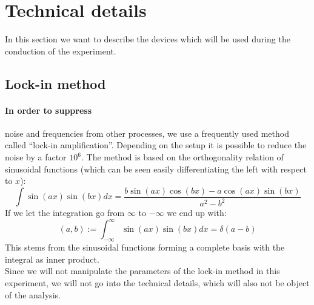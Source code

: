 \section{Technical details}
\label{sec:technics}
In this section we want to describe the devices which will be used during the
conduction of the experiment.
\subsection{Lock-in method}
\paragraph{In order to suppress}
noise and frequencies from other processes, we use
a frequently used method called ``lock-in amplification''. Depending on the
setup it is possible to reduce the noise by a factor $10^6$. The method
is based on the orthogonality relation of sinusoidal functions (which
    can be seen easily differentiating the left with respect to $x$):
\begin{equation}
    \int \sin(a x) \sin(b x) dx =\frac{ b \sin(a x) \cos(b x)-a \cos(a x)
        \sin(b x)}{a^2-b^2}
\end{equation}
If we let the integration go from $\infty$ to $-\infty$ we end up with:
\begin{equation}
    (a,b) := \int_{-\infty}^{\infty} \sin(a x) \sin(b x) dx = \delta(a - b)
\end{equation}
This stems from the sinusoidal functions forming a complete basis with
the integral as inner product.\\
Since we will not manipulate the parameters of the lock-in method in this
experiment, we will not go into the technical details, which
will also not be object of the analysis.
